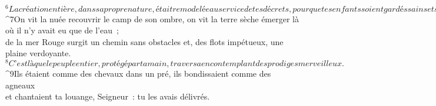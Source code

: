            
         
        ${}^{6}La création entière, dans sa propre nature,
        était remodelée au service de tes décrets,
        pour que tes enfants soient gardés sains et saufs.
        ${}^{7}On vit la nuée recouvrir le camp de son ombre,
        on vit la terre sèche émerger là où il n’y avait eu que de l’eau ;
        \\de la mer Rouge surgit un chemin sans obstacles
        et, des flots impétueux, une plaine verdoyante.
        ${}^{8}C’est là que le peuple entier, protégé par ta main, traversa
        en contemplant des prodiges merveilleux.
        ${}^{9}Ils étaient comme des chevaux dans un pré,
        ils bondissaient comme des agneaux
        \\et chantaient ta louange, Seigneur :
        tu les avais délivrés.
        

